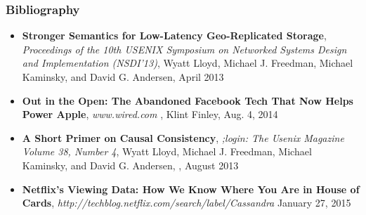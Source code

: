 \documentclass{beamer}
\begin{document}
\begin{frame}
\frametitle{Bibliography}


\begin{itemize}
\item \textbf{Stronger Semantics for Low-Latency Geo-Replicated Storage}, 
\textit{Proceedings of the 10th USENIX Symposium on Networked Systems Design and Implementation (NSDI’13)}, 
Wyatt Lloyd, Michael J. Freedman, Michael Kaminsky, and David G. Andersen, 
April 2013

\item \textbf{Out in the Open: The Abandoned Facebook Tech That Now Helps Power Apple}, 
\textit{www.wired.com}
, Klint Finley, Aug. 4, 2014

\item \textbf{A Short Primer on Causal Consistency}, 
\textit{;login: The Usenix Magazine Volume 38, Number 4}, 
Wyatt Lloyd, Michael J. Freedman, Michael Kaminsky, and David G. Andersen, , August 2013

\item \textbf{Netflix's Viewing Data: How We Know Where You Are in House of Cards},
\textit{http://techblog.netflix.com/search/label/Cassandra}
January 27, 2015


\end{itemize}  
\end{frame}
\end{document}
